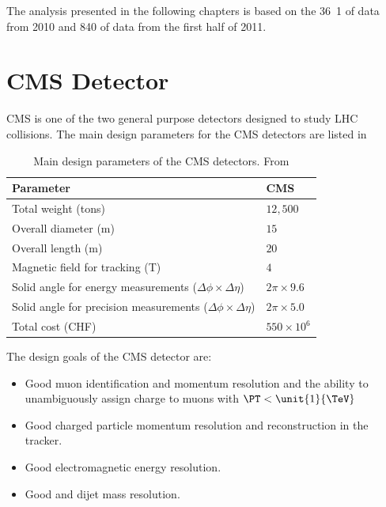 The analysis presented in the following chapters is based on the \unit{36.1} of
data from  2010 and \unit{840}{\invpb} of data from the first half of 2011.

\section{CMS Detector}
{CMS} is one of the two general purpose
detectors designed to study LHC collisions. The main design parameters for the
{CMS} detectors  are listed in 

\begin{table}[htbp]
\begin{center}
\begin{tabular}{ l l }
\toprule
Parameter & CMS \\
\midrule
Total weight (tons)                 & $12,500$  \\
Overall diameter (m)                & $15$  \\
Overall length (m)                  & $20$  \\
Magnetic field for tracking (T)     & $4$  \\
Solid angle for energy measurements ($\Delta\phi \times \Delta\eta$)   
                                    & $2\pi \times 9.6$  \\
Solid angle for precision measurements ($\Delta\phi \times \Delta\eta$)   
                                    & $2\pi \times 5.0$  \\
Total cost (CHF)                    & $550\times 10 ^{6}$  \\
\bottomrule
\end{tabular}
\caption{Main design parameters of the CMS detectors. From \cite{parris}}
\end{center}
\label{tab:cmsparam}
\end{table}

The design goals of the CMS detector are:\cite{tdr}
\begin{itemize}
  \item Good muon identification and momentum resolution and the ability to
unambiguously assign charge to muons with $\PT < \unit{1}{\TeV}$
  \item Good charged particle momentum resolution and reconstruction in the
tracker.
  \item Good electromagnetic energy resolution. 
  \item Good \ETmiss and dijet mass resolution.
\end{itemize}

